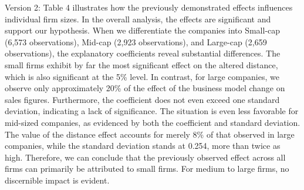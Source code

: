 \documentclass[
]{article}
\begin{document}
\begin{table}[H]
\centering\centering
\caption{Regression Results II}
\centering
{}
\end{table}

Version 2: Table 4 illustrates how the previously demonstrated effects
influences individual firm sizes. In the overall analysis, the effects
are significant and support our hypothesis. When we differentiate the
companies into Small-cap (6,573 observations), Mid-cap (2,923
observations), and Large-cap (2,659 observations), the explanatory
coefficients reveal substantial differences. The small firms exhibit by
far the most significant effect on the altered distance, which is also
significant at the 5\% level. In contrast, for large companies, we
observe only approximately 20\% of the effect of the business model
change on sales figures. Furthermore, the coefficient does not even
exceed one standard deviation, indicating a lack of significance. The
situation is even less favorable for mid-sized companies, as evidenced
by both the coefficient and standard deviation. The value of the
distance effect accounts for merely 8\% of that observed in large
companies, while the standard deviation stands at 0.254, more than twice
as high. Therefore, we can conclude that the previously observed effect
across all firms can primarily be attributed to small firms. For medium
to large firms, no discernible impact is evident.
\end{document}
